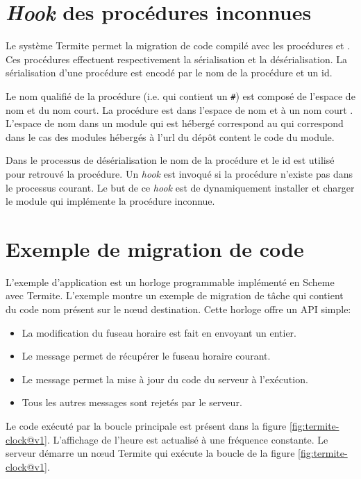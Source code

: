 \section{\textit{Hook} des procédures inconnues}
Le système Termite permet la migration de code compilé avec les procédures
 et . Ces procédures
effectuent respectivement la sérialisation et la désérialisation.
La sérialisation d'une procédure est encodé par le nom de la procédure et
un id.

Le nom qualifié de la procédure (i.e. qui contient un \texttt{\#}) est composé
de l'espace de nom et du nom court. La procédure  est
dans l'espace de nom  et à un nom court .
L'espace de nom dans un module qui est hébergé correspond au 
qui correspond dans le cas des modules hébergés à l'url du dépôt content
le code du module.

Dans le processus de désérialisation le nom de la procédure et le id
est utilisé pour retrouvé la procédure. Un \textit{hook} est invoqué
si la procédure n'existe pas dans le processus courant. Le but de
ce \textit{hook} est de dynamiquement installer et charger le module 
qui implémente la procédure inconnue.

\section{Exemple de migration de code}

L'exemple d'application est un horloge programmable implémenté
en Scheme avec Termite. L'exemple montre un exemple de migration
de tâche qui contient du code nom présent sur le nœud destination.
Cette horloge offre un API simple:
\begin{itemize}
  \item La modification du fuseau horaire est fait en envoyant
    un entier.

  \item Le message  permet de récupérer
    le fuseau horaire courant.

  \item Le message  permet la mise à jour du
    code du serveur à l'exécution.

  \item Tous les autres messages sont rejetés par le serveur.
\end{itemize}

Le code exécuté par la boucle principale est présent dans la figure
\ref{fig:termite-clock@v1}. L'affichage de l'heure est actualisé à
une fréquence constante. Le serveur démarre un nœud Termite qui
exécute la boucle de la figure \ref{fig:termite-clock@v1}.


